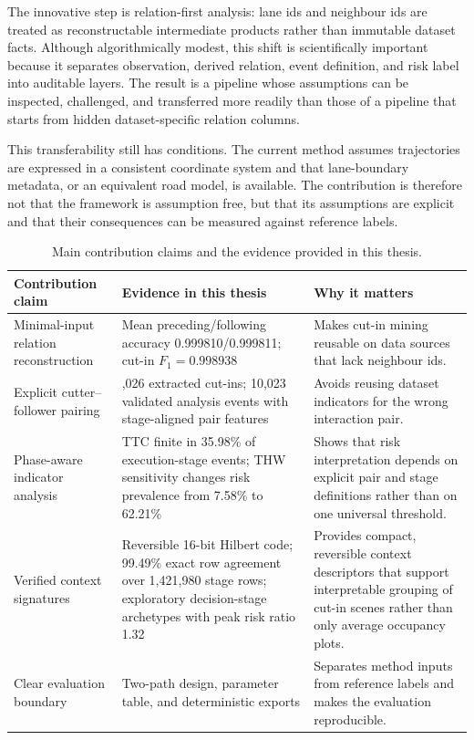 \documentclass[12pt,a4paper,twoside,openright]{report}
\begin{document}
    The innovative step is relation-first analysis: lane ids and neighbour ids are treated as reconstructable intermediate products rather than immutable dataset facts. Although algorithmically modest, this shift is scientifically important because it separates observation, derived relation, event definition, and risk label into auditable layers. The result is a pipeline whose assumptions can be inspected, challenged, and transferred more readily than those of a pipeline that starts from hidden dataset-specific relation columns.

    This transferability still has conditions. The current method assumes trajectories are expressed in a consistent coordinate system and that lane-boundary metadata, or an equivalent road model, is available. The contribution is therefore not that the framework is assumption free, but that its assumptions are explicit and that their consequences can be measured against reference labels.

    \begin{table}[H]
        \centering
        \caption{Main contribution claims and the evidence provided in this thesis.}
        \label{tab:contribution-evidence}
        {\small
        \setlength{\tabcolsep}{4pt}
            \begin{tabularx}{\textwidth}{@{}>{\raggedright\arraybackslash}p{} >{\raggedright\arraybackslash}p{} X@{}}
\toprule
Contribution claim & Evidence in this thesis & Why it matters \\
\midrule
Minimal-input relation reconstruction & Mean preceding/following accuracy 0.999810/0.999811; cut-in $F_1=0.998938$ & Makes cut-in mining reusable on data sources that lack neighbour ids. \\
Explicit cutter--follower pairing & 10,026 extracted cut-ins; 10,023 validated analysis events with stage-aligned pair features & Avoids reusing dataset indicators for the wrong interaction pair. \\
Phase-aware indicator analysis & TTC finite in 35.98\% of execution-stage events; THW sensitivity changes risk prevalence from 7.58\% to 62.21\% & Shows that risk interpretation depends on explicit pair and stage definitions rather than on one universal threshold. \\
Verified context signatures & Reversible 16-bit Hilbert code; 99.49\% exact row agreement over 1,421,980 stage rows; exploratory decision-stage archetypes with peak risk ratio 1.32 & Provides compact, reversible context descriptors that support interpretable grouping of cut-in scenes rather than only average occupancy plots. \\
Clear evaluation boundary & Two-path design, parameter table, and deterministic exports & Separates method inputs from reference labels and makes the evaluation reproducible. \\
\bottomrule
            \end{tabularx}}
    \end{table}
\end{document}
